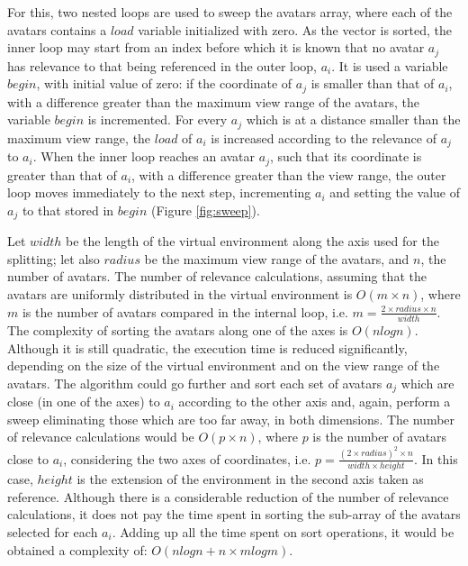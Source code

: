 For this, two nested loops are used to sweep the avatars array, where each of the avatars contains a $load$ variable initialized with zero. As the vector is sorted, the inner loop may start from an index before which it is known that no avatar $a_j$ has relevance to that being referenced in the outer loop, $a_i$. It is used a variable $begin$, with initial value of zero: if the coordinate of $a_j$ is smaller than that of $a_i$, with a difference greater than the maximum view range of the avatars, the variable $begin$ is incremented. For every $a_j$ which is at a distance smaller than the maximum view range, the $load$ of $a_i$ is increased according to the relevance of $a_j$ to $a_i$. When the inner loop reaches an avatar $a_j$, such that its coordinate is greater than that of $a_i$, with a difference greater than the view range, the outer loop moves immediately to the next step, incrementing $a_i$ and setting the value of $a_j$ to that stored in $begin$ (Figure \ref{fig:sweep}).

Let $width$ be the length of the virtual environment along the axis used for the splitting; let also $radius$ be the maximum view range of the avatars, and $n$, the number of avatars. The number of relevance calculations, assuming that the avatars are uniformly distributed in the virtual environment is \mbox{$O(m \times n)$}, where $m$ is the number of avatars compared in the internal loop, i.e. \mbox{$m = \frac{2 \times radius \times n}{width}$}. The complexity of sorting the avatars along one of the axes is $O(nlogn)$. Although it is still quadratic, the execution time is reduced significantly, depending on the size of the virtual environment and on the view range of the avatars. The algorithm could go further and sort each set of avatars $a_j$ which are close (in one of the axes) to $a_i$ according to the other axis and, again, perform a sweep eliminating those which are too far away, in both dimensions. The number of relevance calculations would be \mbox{$O(p \times n)$}, where $p$ is the number of avatars close to $a_i$, considering the two axes of coordinates, i.e. \mbox{$p = \frac{(2 \times radius)^2 \times n}{width \times height}$}. In this case, $height$ is the extension of the environment in the second axis taken as reference. Although there is a considerable reduction of the number of relevance calculations, it does not pay the time spent in sorting the sub-array of the avatars selected for each $a_i$. Adding up all the time spent on sort operations, it would be obtained a complexity of: \mbox{$O(nlogn + n \times mlogm)$}.

